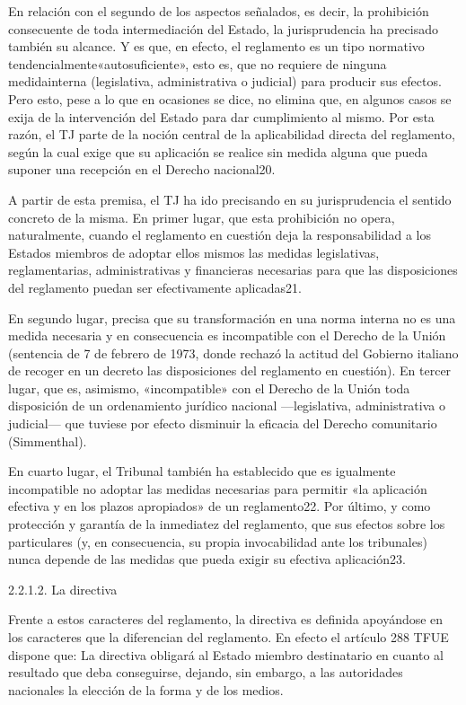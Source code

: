 \documentclass[10pt,a4paper]{article}
\begin{document}
En relación con el segundo de los aspectos señalados, es decir, la prohibición consecuente de toda intermediación del Estado, la jurisprudencia ha precisado también su alcance. Y es que, en efecto, el reglamento es un tipo normativo tendencialmente«autosuficiente», esto es, que no requiere de ninguna medidainterna (legislativa, administrativa o judicial) para producir sus efectos. Pero esto, pese a lo que en ocasiones se dice, no elimina que, en algunos casos se exija de la intervención del Estado para dar cumplimiento al mismo. Por esta razón, el TJ parte de la noción central de la aplicabilidad directa del reglamento, según la cual exige que su aplicación se realice sin medida alguna que pueda suponer una recepción en el Derecho nacional20. 

A partir de esta premisa, el TJ ha ido precisando en su jurisprudencia el sentido concreto de la misma. En primer lugar, que esta prohibición no opera, naturalmente, cuando el reglamento en cuestión deja la responsabilidad a los Estados miembros de adoptar ellos mismos las medidas legislativas, reglamentarias, administrativas y financieras necesarias para que las disposiciones del reglamento puedan ser efectivamente aplicadas21.

En segundo lugar, precisa que su transformación en una norma interna no es una medida necesaria y en consecuencia es incompatible con el Derecho de la Unión (sentencia de 7 de febrero de 1973, donde rechazó la actitud del Gobierno italiano de recoger en un decreto las disposiciones del reglamento en cuestión). En tercer lugar, que es, asimismo, «incompatible» con el Derecho de la Unión toda disposición de un ordenamiento jurídico nacional —legislativa, administrativa o judicial— que tuviese por efecto disminuir la eficacia del Derecho comunitario (Simmenthal). 

En cuarto lugar, el Tribunal también ha establecido que es igualmente incompatible no adoptar las medidas necesarias para permitir «la aplicación efectiva y en los plazos apropiados» de un reglamento22. Por último, y como protección y garantía de la inmediatez del reglamento, que sus efectos sobre los particulares (y, en consecuencia, su propia invocabilidad ante los tribunales) nunca depende de las medidas que pueda exigir su efectiva aplicación23.

2.2.1.2. La directiva

Frente a estos caracteres del reglamento, la directiva es definida apoyándose en los caracteres que la diferencian del reglamento. En efecto el artículo 288 TFUE dispone que: La directiva obligará al Estado miembro destinatario en cuanto al resultado que deba conseguirse, dejando, sin embargo, a las autoridades nacionales la elección de la forma y de los medios.
\end{document}
